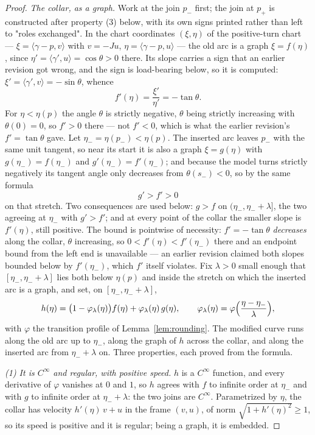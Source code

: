 \begin{proof}
\emph{The collar, as a graph.} Work at the join $p_-$ first; the join at
$p_+$ is constructed after property (3) below, with its own signs printed
rather than left to "roles exchanged". In the chart coordinates
$(\xi,\eta)$ of the positive-turn chart --- $\xi=\langle\gamma-p,v\rangle$ with
$v=-Ju$, $\eta=\langle\gamma-p,u\rangle$ --- the old arc is a graph
$\xi=f(\eta)$, since $\eta'=\langle\gamma',u\rangle=\cos\theta>0$ there. Its
slope carries a sign that an earlier revision got wrong, and the sign is
load-bearing below, so it is computed:
$\xi'=\langle\gamma',v\rangle=-\sin\theta$, whence
\[
   f'(\eta)=\frac{\xi'}{\eta'}=-\tan\theta .
\]
For $\eta<\eta(p)$ the angle $\theta$ is strictly negative, $\theta$ being
strictly increasing with $\theta(0)=0$, so $f'>0$ there --- not $f'<0$, which is
what the earlier revision's $f'=\tan\theta$ gave. Let
$\eta_-=\eta(p_-)<\eta(p)$. The inserted arc leaves $p_-$ with the same unit
tangent, so near its start it is also a graph $\xi=g(\eta)$ with
$g(\eta_-)=f(\eta_-)$ and $g'(\eta_-)=f'(\eta_-)$; and because the model turns
strictly negatively its tangent angle only decreases from $\theta(s_-)<0$, so by
the same formula
\[
   g'>f'>0
\]
on that stretch. Two consequences are used below: $g>f$ on
$(\eta_-,\eta_-+\lambda]$, the two agreeing at $\eta_-$ with $g'>f'$; and at
every point of the collar the smaller slope is $f'(\eta)$, still positive. The
bound is pointwise of necessity: $f'=-\tan\theta$ \emph{decreases} along the
collar, $\theta$ increasing, so $0<f'(\eta)<f'(\eta_-)$ there and an endpoint
bound from the left end is unavailable --- an earlier revision claimed both
slopes bounded below by $f'(\eta_-)$, which $f'$ itself violates. Fix
$\lambda>0$ small enough that $[\eta_-,\eta_-+\lambda]$ lies both below
$\eta(p)$ and inside the stretch on which the inserted arc is a graph, and set,
on $[\eta_-,\eta_-+\lambda]$,
\[
   h(\eta)=\bigl(1-\varphi_\lambda(\eta)\bigr)f(\eta)+\varphi_\lambda(\eta)\,
   g(\eta),
   \qquad
   \varphi_\lambda(\eta)=\varphi\Bigl(\frac{\eta-\eta_-}{\lambda}\Bigr),
\]
with $\varphi$ the transition profile of Lemma~\ref{lem:rounding}. The modified
curve runs along the old arc up to $\eta_-$, along the graph of $h$ across the
collar, and along the inserted arc from $\eta_-+\lambda$ on. Three properties,
each proved from the formula.

\emph{(1) It is $C^\infty$ and regular, with positive speed.} $h$ is a $C^\infty$
function, and every derivative of $\varphi$ vanishes at $0$ and $1$, so $h$
agrees with $f$ to infinite order at $\eta_-$ and with $g$ to infinite order at
$\eta_-+\lambda$: the two joins are $C^\infty$. Parametrized by $\eta$, the
collar has velocity $h'(\eta)\,v+u$ in the frame $(v,u)$, of norm
$\sqrt{1+h'(\eta)^2}\geq1$, so its speed is positive and it is regular; being a
graph, it is embedded.


\end{proof}
